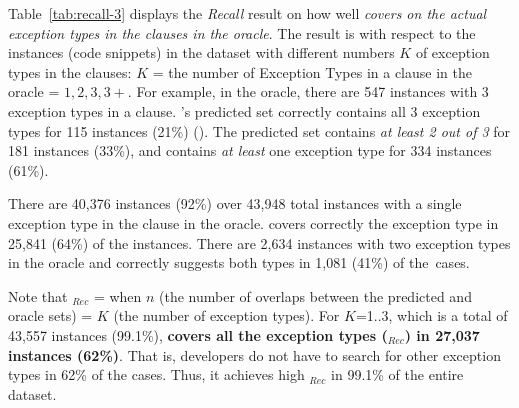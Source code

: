 Table~\ref{tab:recall-3} displays the {\em Recall} result on how well
{\em {\tool} covers on the actual exception types in the 
  clauses in the oracle}. The result is with respect to the instances
(code snippets) in the dataset with different numbers $K$ of exception
types in the  clauses: $K$ = the number of Exception Types
in a  clause in the oracle = $1,2,3,3+$. For example, in the
oracle, there are 547 instances with 3 exception types in a
 clause. {\tool}'s predicted set correctly contains all 3
exception types for 115 instances (21\%) (). The
predicted set contains {\em at least 2 out of 3} for 181 instances
(33\%), and contains {\em at least} one exception type for 334 instances
(61\%).




There are 40,376 instances (92\%) over 43,948 total instances with a
single exception type in the  clause in the
oracle. {\tool} covers correctly the exception type in 25,841
(64\%) of the instances. There are 2,634 instances with two exception
types in the oracle and {\tool} correctly suggests both types in
1,081 (41\%) of the~cases.


Note that $_{Rec}$ =  when $n$ (the number
of overlaps between the predicted and oracle sets) = $K$ (the number
of exception types). For $K$=1..3, which is a total of 43,557
instances (99.1\%), {\bf {\tool} covers all the exception types
  ($_{Rec}$) in 27,037 instances (62\%)}. That is,
developers do not have to search for other exception types in 62\% of
the cases. Thus, it achieves high $_{Rec}$ in 99.1\% of
  the entire dataset.


